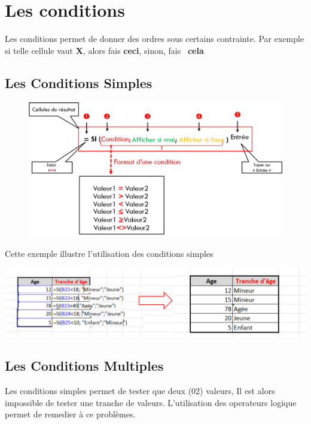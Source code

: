 \section{Les conditions}
Les conditions permet de donner des ordres sous certains contrainte. Par exemple si telle cellule vaut \textbf{X}, alors fais \textbf{ceci},	sinon, fais	
  \textbf{cela}	

\subsection{Les Conditions Simples}
\begin{figure}[H]
	\centering
	\includegraphics[scale=0.2,width= \linewidth]{img/conditions_syntaxt}
\end{figure}

\begin{Exemple}
	Cette exemple illustre l'utilisation des conditions simples
\end{Exemple}
\begin{center}  
	\includegraphics[scale=0.2,width=\linewidth]{img/condition_exemple}
\end{center}

\subsection{Les Conditions Multiples}
Les conditions simples permet de tester que deux (02) valeurs, Il est alors impossible de tester une tranche de valeurs. L'utilisation des operateurs logique permet de remedier à ce problèmes.

